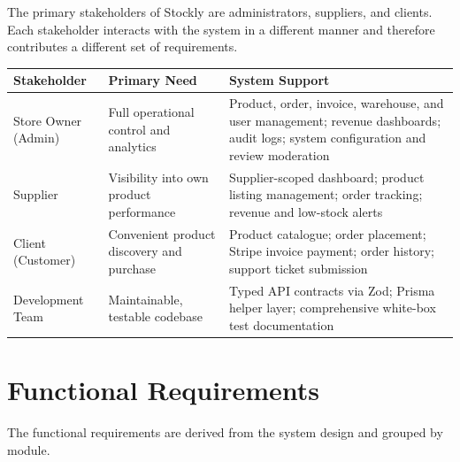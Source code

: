\documentclass[12pt,a4paper]{report}
\begin{document}
The primary stakeholders of Stockly are administrators, suppliers, and clients. Each stakeholder interacts with the system in a different manner and therefore contributes a different set of requirements.

\begin{longtable}{p{}p{}p{}}
    \toprule
    \textbf{Stakeholder} & \textbf{Primary Need} & \textbf{System Support} \\
    \midrule
    \endhead
    Store Owner (Admin) & Full operational control and analytics & Product, order, invoice, warehouse, and user management; revenue dashboards; audit logs; system configuration and review moderation \\
    Supplier & Visibility into own product performance & Supplier-scoped dashboard; product listing management; order tracking; revenue and low-stock alerts \\
    Client (Customer) & Convenient product discovery and purchase & Product catalogue; order placement; Stripe invoice payment; order history; support ticket submission \\
    Development Team & Maintainable, testable codebase & Typed API contracts via Zod; Prisma helper layer; comprehensive white-box test documentation \\
    \bottomrule
\end{longtable}

\section{Functional Requirements}

The functional requirements are derived from the system design and grouped by module.
\end{document}
